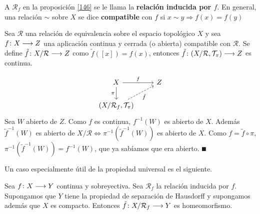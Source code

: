 \documentclass[GTS.tex]{subfiles}
\begin{document}
\vspace{1cm}

\begin{defi} A $\mathcal{R}_f$ en la proposición \ref{146} se le llama la \textbf{relación inducida por $f$}. En general, una relación $\sim$ sobre $X$ se dice \textbf{compatible} con $f$ si $x\sim y\Rightarrow f(x)=f(y)$
\end{defi}

\begin{prop}\label{149}
Sea $\mathcal{R}$ una relación de equivalencia sobre el espacio topológico $X$ y sea $f\colon{X}\longrightarrow{Z}$ una aplicación continua y cerrada (o abierta) compatible con $\mathcal{R}$. Se define $\tilde{f}\colon{X/\mathcal{R}}\longrightarrow{Z}$ como $\tilde{f}([x])=f(x)$, entonces $\tilde{f}\colon{(X/\mathcal{R},\mathcal{T}_\pi)}\longrightarrow{Z}$ es continua.
\end{prop}
\begin{dem}
\[
\begin{tikzcd}
X \ar[r, "f"]\arrow[d,"\pi "'] & Z\\
\left(X/\mathcal{R}_f,\Tau_\pi\right) \arrow[ur, dashrightarrow, "\tilde{f} "']
\end{tikzcd}
\]
Sea $W$ abierto de $Z$. Como $f$ es continua, $f^{-1}(W)$ es abierto de $X$. Además $\tilde{f}^{-1}(W)$ es abierto de $X/\mathcal{R}\Leftrightarrow\pi^{-1}(\tilde{f}^{-1}(W))$ es abierto de $X$. Como $f=\tilde{f}\circ\pi$, $\pi^{-1}(\tilde{f}^{-1}(W))=f^{-1}(W)$, que ya sabíamos que era abierto. $\QED$
\end{dem}

\vspace{0.4cm}

Un caso especialmente útil de la propiedad universal es el siguiente.
\begin{prop} Sea $f\colon{X}\longrightarrow{Y}$ continua y sobreyectiva. Sea $\mathcal{R}_f$ la relación inducida por $f$. Supongamos que $Y$ tiene la propiedad de separación de Hausdorff y supongamos además que $X$ es compacto. Entonces $\tilde{f}\colon{X/\mathcal{R}_f}\longrightarrow{Y}$ es homeomorfismo.
\end{prop}
\end{document}
